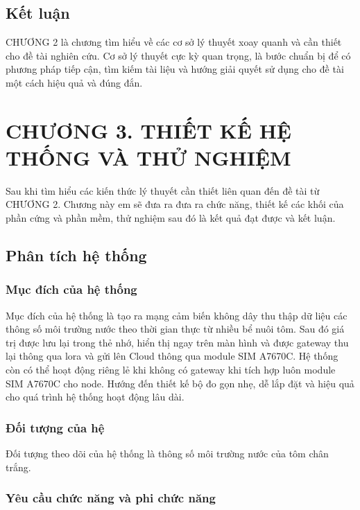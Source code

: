\documentclass{article} %
\begin{document}
	\subsection{Kết luận}
	CHƯƠNG 2 là chương tìm hiểu về các cơ sở lý thuyết xoay quanh và cần thiết cho đề tài nghiên cứu. Cơ sở lý thuyết cực kỳ quan trọng, là bước chuẩn bị để có phương pháp tiếp cận, tìm kiếm tài liệu và hướng giải quyết sử dụng cho đề tài một cách hiệu quả và đúng đắn.
	
	
	\newpage
	\section*{CHƯƠNG 3. THIẾT KẾ HỆ THỐNG VÀ THỬ NGHIỆM}
	\setcounter{section}{3}
	\setcounter{subsection}{0}
	\setcounter{figure}{0}
	\setcounter{table}{0}
	Sau khi tìm hiểu các kiến thức lý thuyết cần thiết liên quan đến đề tài từ CHƯƠNG 2. Chương này em sẽ đưa ra đưa ra chức năng, thiết kế các khối của phần cứng và phần mềm, thử nghiệm sau đó là kết quả đạt được và kết luận.
	
	\subsection{Phân tích hệ thống}
	\subsubsection{Mục đích của hệ thống}
	
	Mục đích của hệ thống là tạo ra mạng cảm biến không dây thu thập dữ liệu các thông số môi trường nước theo thời gian thực từ nhiều bể nuôi tôm. Sau đó giá trị được lưu lại trong thẻ nhớ, hiển thị ngay trên màn hình và được gateway thu lại thông qua lora và gửi lên Cloud thông qua module SIM A7670C. Hệ thống còn có thể hoạt động riêng lẻ khi không có gateway khi tích hợp luôn module SIM A7670C cho node. Hướng đến thiết kế bộ đo gọn nhẹ, dễ lắp đặt và hiệu quả cho quá trình hệ thống hoạt động lâu dài.
	
	\subsubsection{Đối tượng của hệ}
	Đối tượng theo dõi của hệ thống là thông số môi trường nước của tôm chân trắng.
	
	\subsubsection{Yêu cầu chức năng và phi chức năng}
\end{document}
